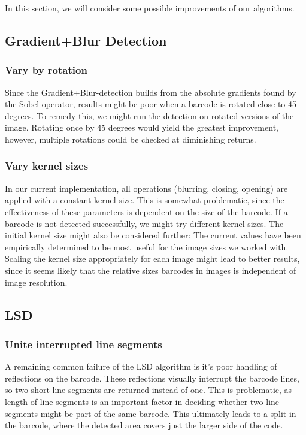 In this section, we will consider some possible improvements of our algorithms.

\subsection{Gradient+Blur Detection}

\subsubsection*{Vary by rotation}
Since the Gradient+Blur-detection builds from the absolute gradients found by the Sobel operator, results might be poor when a barcode is rotated close to 45 degrees. To remedy this, we might run the detection on rotated versions of the image. Rotating once by 45 degrees would yield the greatest improvement, however, multiple rotations could be checked at diminishing returns.

\subsubsection*{Vary kernel sizes}
In our current implementation, all operations (blurring, closing, opening) are applied with a constant kernel size. This is somewhat problematic, since the effectiveness of these parameters is dependent on the size of the barcode. If a barcode is not detected successfully, we might try different kernel sizes.\newline
The initial kernel size might also be considered further: The current values have been empirically determined to be most useful for the image sizes we worked with. Scaling the kernel size appropriately for each image might lead to better results, since it seems likely that the relative sizes barcodes in images is independent of image resolution.


\subsection{LSD}
\subsubsection*{Unite interrupted line segments}

A remaining common failure of the LSD algorithm is it's poor handling of reflections on the barcode. These reflections visually interrupt the barcode lines, so two short line segments are returned instead of one. This is problematic, as length of line segments is an important factor in deciding whether two line segments might be part of the same barcode. This ultimately leads to a split in the barcode, where the detected area covers just the larger side of the code.

